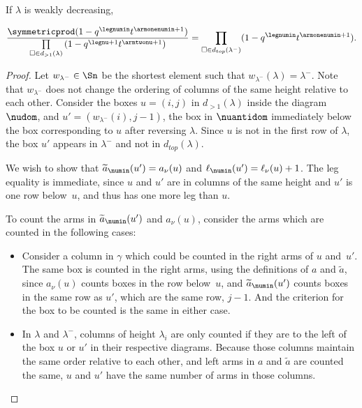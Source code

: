 \begin{lemm}\label{lambdalemma} If $\lambda$ is weakly decreasing,

\begin{equation}\label{lambdaequality}\frac{\symmetricprod (1-q^{\legnumin}t^{\armonenumin + 1}) }{  \prod\limits_{\square \in d_{>1}(\lambda)} \left(1-q^{\legnu+1}t^{\armtwonu +1} \right)  } = \prod\limits_{\square \in d_{top}(\lambda^-)} (1-q^\legnumin t^{\armonenumin + 1}).\end{equation}\end{lemm}

\begin{proof}
Let $w_{\lambda^-}\in \Sn$ be the shortest element such that $w_{\lambda^-}(\lambda)=\lambda^-$. Note that $w_{\lambda^-}$ does not change the ordering of columns of the same height relative to each other. Consider the boxes $u=(i,j)$ in $d_{>1}(\lambda)$ inside the diagram $\nudom$, and $u'=(w_{\lambda^-}(i),j-1)$, the box in $\nuantidom$ immediately below the box corresponding to $u$ after reversing $\lambda$. Since $u$ is not in the first row of $\lambda$, the box $u'$ appears in $\lambda^-$ and not in $d_{top}(\lambda)$.

We wish to show that $\widetilde{a}_\numin(u')=a_\nu(u)$ and $\ell_{\numin}(u')=\ell_\nu(u)+1$. The leg equality is immediate, since $u$ and $u'$ are in columns of the same height and $u'$ is one row below~$u$, and thus has one more leg than $u$.

To count the arms in $\widetilde{a}_\numin(u')$ and $a_\nu(u)$, consider the arms which are counted in the following cases:

\begin{itemize} \item Consider a column in $\gamma$ which could be counted in the right arms of $u$ and~$u'$. The same box is counted in the right arms, using the definitions of $a$ and $\widetilde{a}$, since $a_\nu(u)$ counts boxes in the row below~$u$, and $\widetilde{a}_\numin(u')$ counts boxes in the same row as $u'$, which are the same row, $j-1$. And the criterion for the box to be counted is the same in either case.

\item In $\lambda$ and $\lambda^-$, columns of height $\lambda_i$ are only counted if they are to the left of the box $u$ or $u'$ in their respective diagrams. Because those columns maintain the same order relative to each other, and left arms in $a$ and $\widetilde{a}$ are counted the same, $u$ and $u'$ have the same number of arms in those columns. 


\end{itemize}
\end{proof}
